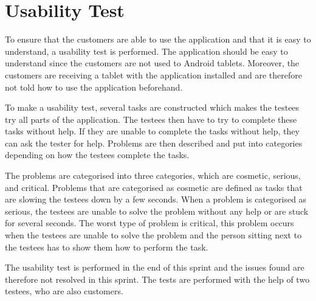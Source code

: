 \section{Usability Test}\label{sec:usability-test}
To ensure that the customers are able to use the application and that it is easy to understand, a usability test is performed.
The application should be easy to understand since the customers are not used to Android tablets.
Moreover, the customers are receiving a tablet with the application installed and are therefore not told how to use the application beforehand.

To make a usability test, several tasks are constructed which makes the testees try all parts of the application. 
The testees then have to try to complete these tasks without help.
If they are unable to complete the tasks without help, they can ask the tester for help.
Problems are then described and put into categories depending on how the testees complete the tasks.

The problems are categorised into three categories, which are cosmetic, serious, and critical.
Problems that are categorised as cosmetic are defined as tasks that are slowing the testees down by a few seconds.
When a problem is categorised as serious, the testees are unable to solve the problem without any help or are stuck for several seconds.
The worst type of problem is critical, this problem occurs when the testees are unable to solve the problem and the person sitting next to the testees has to show them how to perform the task.

The usability test is performed in the end of this sprint and the issues found are therefore not resolved in this sprint.
The tests are performed with the help of two testees, who are also customers.

